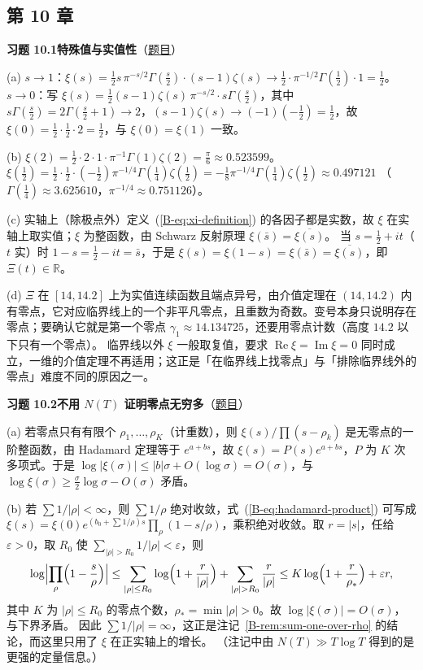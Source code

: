 \documentclass[11pt,a4paper]{article}
\newcommand{\RR}{\mathbb{R}}
\renewcommand{\Re}{\operatorname{Re}}
\renewcommand{\Im}{\operatorname{Im}}
\newcommand{\bref}[1]{\ref*{B-#1}}
\newcommand{\Sol}[2]{%
  \par\addvspace{1.2em}\noindent
  \hypertarget{s:#1}{}\textbf{习题 #1\quad #2}\hfill{\small（\hyperlink{q:#1}{题目}）}\par
  \nopagebreak\smallskip}
\begin{document}
\subsection*{第 10 章}

\Sol{10.1}{特殊值与实值性}
(a) $s\to1$：$\xi(s)=\frac12s\,\pi^{-s/2}\Gamma(\frac s2)\cdot(s-1)\zeta(s)\to\frac12\cdot\pi^{-1/2}\Gamma(\frac12)\cdot1=\frac12$。
$s\to0$：写 $\xi(s)=\frac12(s-1)\zeta(s)\,\pi^{-s/2}\cdot s\Gamma(\frac s2)$，其中 $s\Gamma(\frac s2)=2\Gamma(\frac s2+1)\to2$，$(s-1)\zeta(s)\to(-1)(-\frac12)=\frac12$，故 $\xi(0)=\frac12\cdot\frac12\cdot2=\frac12$，与 $\xi(0)=\xi(1)$ 一致。

(b) $\xi(2)=\frac12\cdot2\cdot1\cdot\pi^{-1}\Gamma(1)\zeta(2)=\frac{\pi}{6}\approx0.523599$。
$\xi(\frac12)=\frac12\cdot\frac12\cdot(-\frac12)\pi^{-1/4}\Gamma(\frac14)\zeta(\frac12)=-\frac18\pi^{-1/4}\Gamma(\frac14)\zeta(\frac12)\approx0.497121$
（$\Gamma(\frac14)\approx3.625610$，$\pi^{-1/4}\approx0.751126$）。

(c) 实轴上（除极点外）定义~(\bref{eq:xi-definition}) 的各因子都是实数，故 $\xi$ 在实轴上取实值；$\xi$ 为整函数，由 Schwarz 反射原理 $\xi(\bar s)=\overline{\xi(s)}$。
当 $s=\frac12+it$（$t$ 实）时 $1-s=\frac12-it=\bar s$，于是
$\xi(s)=\xi(1-s)=\xi(\bar s)=\overline{\xi(s)}$，即 $\Xi(t)\in\RR$。

(d) $\Xi$ 在 $[14,14.2]$ 上为实值连续函数且端点异号，由介值定理在 $(14,14.2)$ 内有零点，它对应临界线上的一个非平凡零点，且重数为奇数。变号本身只说明存在零点；要确认它就是第一个零点 $\gamma_1\approx14.134725$，还要用零点计数（高度 $14.2$ 以下只有一个零点）。
临界线以外 $\xi$ 一般取复值，要求 $\Re\xi=\Im\xi=0$ 同时成立，一维的介值定理不再适用；这正是「在临界线上找零点」与「排除临界线外的零点」难度不同的原因之一。

\Sol{10.2}{不用 $N(T)$ 证明零点无穷多}
(a) 若零点只有有限个 $\rho_1,\dots,\rho_K$（计重数），则 $\xi(s)/\prod(s-\rho_k)$ 是无零点的一阶整函数，由 Hadamard 定理等于 $e^{a+bs}$，故 $\xi(s)=P(s)e^{a+bs}$，$P$ 为 $K$ 次多项式。于是 $\log|\xi(\sigma)|\le|b|\sigma+O(\log\sigma)=O(\sigma)$，与 $\log\xi(\sigma)\ge\frac\sigma2\log\sigma-O(\sigma)$ 矛盾。

(b) 若 $\sum1/|\rho|<\infty$，则 $\sum1/\rho$ 绝对收敛，式~(\bref{eq:hadamard-product}) 可写成
$\xi(s)=\xi(0)e^{(b_0+\sum1/\rho)s}\prod_\rho(1-s/\rho)$，乘积绝对收敛。取 $r=|s|$，任给 $\varepsilon>0$，取 $R_0$ 使 $\sum_{|\rho|>R_0}1/|\rho|<\varepsilon$，则
\[
  \log\Bigl|\prod_\rho\Bigl(1-\frac s\rho\Bigr)\Bigr|
  \le\sum_{|\rho|\le R_0}\log\Bigl(1+\frac r{|\rho|}\Bigr)+\sum_{|\rho|>R_0}\frac r{|\rho|}
  \le K\log\Bigl(1+\frac r{\rho_*}\Bigr)+\varepsilon r ,
\]
其中 $K$ 为 $|\rho|\le R_0$ 的零点个数，$\rho_*=\min|\rho|>0$。故 $\log|\xi(\sigma)|=O(\sigma)$，与下界矛盾。
因此 $\sum1/|\rho|=\infty$，这正是注记~\bref{rem:sum-one-over-rho} 的结论，而这里只用了 $\xi$ 在正实轴上的增长。
（注记中由 $N(T)\gg T\log T$ 得到的是更强的定量信息。）
\end{document}
